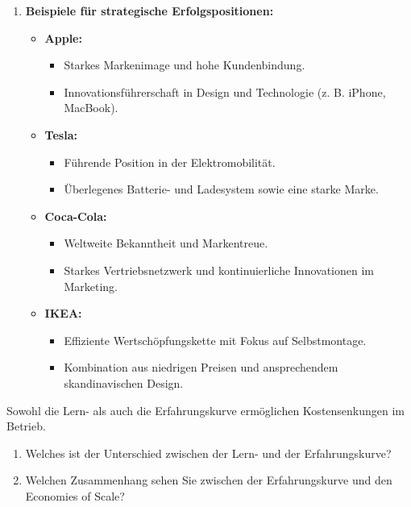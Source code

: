 {\begin{enumerate}[label=(\alph*)]
    \item \textbf{Beispiele für strategische Erfolgspositionen:}
    \begin{itemize}
        \item \textbf{Apple:} 
        \begin{itemize}
            \item Starkes Markenimage und hohe Kundenbindung.
            \item Innovationsführerschaft in Design und Technologie (z. B. iPhone, MacBook).
        \end{itemize}
        \item \textbf{Tesla:}
        \begin{itemize}
            \item Führende Position in der Elektromobilität.
            \item Überlegenes Batterie- und Ladesystem sowie eine starke Marke.
        \end{itemize}
        \item \textbf{Coca-Cola:}
        \begin{itemize}
            \item Weltweite Bekanntheit und Markentreue.
            \item Starkes Vertriebsnetzwerk und kontinuierliche Innovationen im Marketing.
        \end{itemize}
        \item \textbf{IKEA:}
        \begin{itemize}
            \item Effiziente Wertschöpfungskette mit Fokus auf Selbstmontage.
            \item Kombination aus niedrigen Preisen und ansprechendem skandinavischen Design.
        \end{itemize}
    \end{itemize}
\end{enumerate}
}

Sowohl die Lern- als auch die Erfahrungskurve ermöglichen Kostensenkungen im Betrieb.

\begin{enumerate}[label=(\alph*)]
    \item Welches ist der Unterschied zwischen der Lern- und der Erfahrungskurve?
    \item Welchen Zusammenhang sehen Sie zwischen der Erfahrungskurve und den Economies of Scale?
\end{enumerate}

